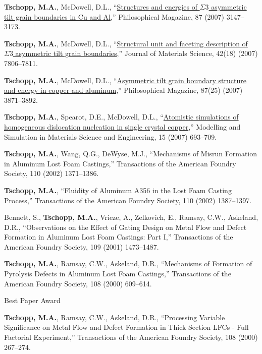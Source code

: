 \begin{cvlist}
\item 
\textbf{Tschopp, M.A.}, McDowell, D.L., ``\href{http://dx.DOI.org/10.1080/14786430701255895}{Structures and energies of $\Sigma3$ asymmetric tilt grain boundaries in Cu and Al},'' Philosophical Magazine, 87 (2007) 3147--3173.

\item 
\textbf{Tschopp, M.A.}, McDowell, D.L., ``\href{http://dx.DOI.org/10.1007/s10853-007-1626-6}{Structural unit and faceting description of $\Sigma3$ asymmetric tilt grain boundaries},'' Journal of Materials Science, 42(18) (2007) 7806--7811.

\item 
\textbf{Tschopp, M.A.}, McDowell, D.L., ``\href{http://dx.DOI.org/10.1080/14786430701455321}{Asymmetric tilt grain boundary structure and energy in copper and aluminum},'' Philosophical Magazine, 87(25) (2007) 3871--3892.

\item 
\textbf{Tschopp, M.A.}, Spearot, D.E., McDowell, D.L., ``\href{http://dx.DOI.org/10.1088/0965-0393/15/7/001}{Atomistic simulations of homogeneous dislocation nucleation in single crystal copper},'' Modelling and Simulation in Materials Science and Engineering, 15 (2007) 693--709.

\item 
\textbf{Tschopp, M.A.}, Wang, Q.G., DeWyse, M.J., ``{Mechanisms of Misrun Formation in Aluminum Lost Foam Castings},'' Transactions of the American Foundry Society, 110 (2002) 1371--1386. 

\item 
\textbf{Tschopp, M.A.}, ``{Fluidity of Aluminum A356 in the Lost Foam Casting Process},'' Transactions of the American Foundry Society, 110 (2002) 1387--1397. 

\item 
Bennett, S., \textbf{Tschopp, M.A.}, Vrieze, A., Zelkovich, E., Ramsay, C.W., Askeland, D.R., ``{Observations on the Effect of Gating Design on Metal Flow and Defect Formation in Aluminum Lost Foam Castings: Part I},'' Transactions of the American Foundry Society, 109 (2001) 1473--1487.

\item 
\textbf{Tschopp, M.A.}, Ramsay, C.W., Askeland, D.R., ``{Mechanisms of Formation of Pyrolysis Defects in Aluminum Lost Foam Castings},'' Transactions of the American Foundry Society, 108 (2000) 609--614.
\begin{list2}
\item[$\star$] {Best Paper Award}
\end{list2}

\item 
\textbf{Tschopp, M.A.}, Ramsay, C.W., Askeland, D.R., ``Processing Variable Significance on Metal Flow and Defect Formation in Thick Section LFCs - Full Factorial Experiment,'' Transactions of the American Foundry Society, 108 (2000) 267--274. 

\end{cvlist}

